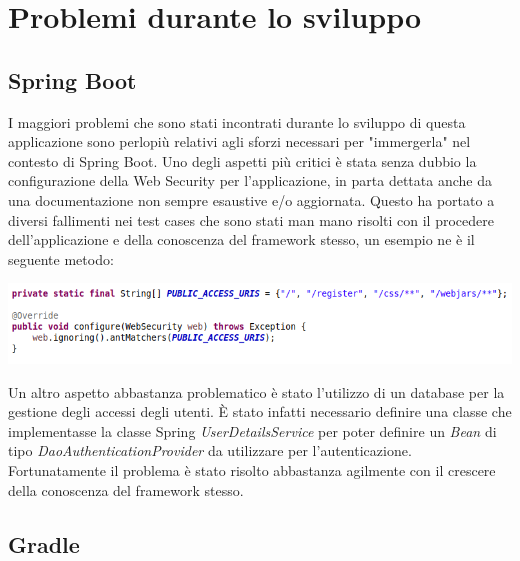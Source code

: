 \section{Problemi durante lo sviluppo}

\subsection{Spring Boot}
I maggiori problemi che sono stati incontrati durante lo sviluppo di questa applicazione sono perlopiù relativi agli sforzi necessari per "immergerla" nel contesto di Spring Boot.\newline
Uno degli aspetti più critici è stata senza dubbio la configurazione della Web Security per l'applicazione, in parta dettata anche da una documentazione non sempre esaustive e/o aggiornata. Questo ha portato a diversi fallimenti nei test cases che sono stati man mano risolti con il procedere dell'applicazione e della conoscenza del framework stesso, un esempio ne è il seguente metodo:

\vspace{1cm}

\begin{minipage}{\linewidth}
	\includegraphics[width=\textwidth]{img/websecurity.png}
\end{minipage}

Un altro aspetto abbastanza problematico è stato l'utilizzo di un database per la gestione degli accessi degli utenti. È stato infatti necessario definire una classe che implementasse la classe Spring \textsl{UserDetailsService} per poter definire un \textsl{Bean} di tipo \textsl{DaoAuthenticationProvider} da utilizzare per l'autenticazione. Fortunatamente il problema è stato risolto abbastanza agilmente con il crescere della conoscenza del framework stesso.

\subsection{Gradle}

